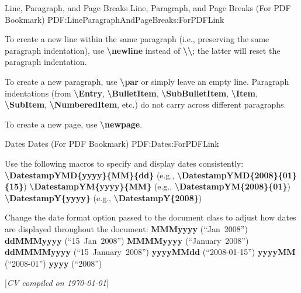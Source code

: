 \documentclass[letterpaper,MMMyyyy,nonstopmode]{simpleresumecv}
\newcommand{\CVNote}{CV compiled on {\today}}
\newcommand{\Code}[1]{\mbox{\textbf{#1}}}
\newcommand{\CodeCommand}[1]{\mbox{\textbf{\textbackslash{#1}}}}
\begin{document}
\begin{Body}
\BigGap
\SubSection
{Line, Paragraph, and Page Breaks}
{Line, Paragraph, and Page Breaks (For PDF Bookmark)}
{PDF:LineParagraphAndPageBreaks:ForPDFLink}

\Gap
\BulletItem
To create a new line within the same paragraph (i.e., preserving the same paragraph indentation), use \CodeCommand{newline} instead of \CodeCommand{\textbackslash};
the latter will reset the paragraph indentation.

\Gap
\BulletItem
To create a new paragraph, use \CodeCommand{par} or simply leave an empty line.
Paragraph indentations (from
\CodeCommand{Entry},
\CodeCommand{BulletItem},
\CodeCommand{SubBulletItem},
\CodeCommand{Item},
\CodeCommand{SubItem},
\CodeCommand{NumberedItem},
etc.) do not carry across different paragraphs.

\Gap
\BulletItem
To create a new page, use \CodeCommand{newpage}.

\BigGap
\SubSection
{Dates}
{Dates (For PDF Bookmark)}
{PDF:Dates:ForPDFLink}

\Gap
\BulletItem
Use the following macros to specify and display dates consistently:
\SubBulletItem
\CodeCommand{DatestampYMD\{yyyy\}\{MM\}\{dd\}}
(e.g., \CodeCommand{DatestampYMD\{2008\}\{01\}\{15\}})
\SubBulletItem
\CodeCommand{DatestampYM\{yyyy\}\{MM\}}
(e.g., \CodeCommand{DatestampYM\{2008\}\{01\}})
\SubBulletItem
\CodeCommand{DatestampY\{yyyy\}}
(e.g., \CodeCommand{DatestampY\{2008\}})

\Gap
\BulletItem
Change the date format option passed to the document class to adjust how dates are displayed throughout the document:
\SubBulletItem
\Code{MMMyyyy} (``Jan~2008'')
\SubBulletItem
\Code{ddMMMyyyy} (``15~Jan~2008'')
\SubBulletItem
\Code{MMMMyyyy} (``January~2008'')
\SubBulletItem
\Code{ddMMMMyyyy} (``15~January~2008'')
\SubBulletItem
\Code{yyyyMMdd} (``2008-01-15'')
\SubBulletItem
\Code{yyyyMM} (``2008-01'')
\SubBulletItem
\Code{yyyy} (``2008'')

\endgroup

\fi

\end{Body}




\UseNoteFont%
\null\hfill%
[\textit{\CVNote}]
\end{document}
